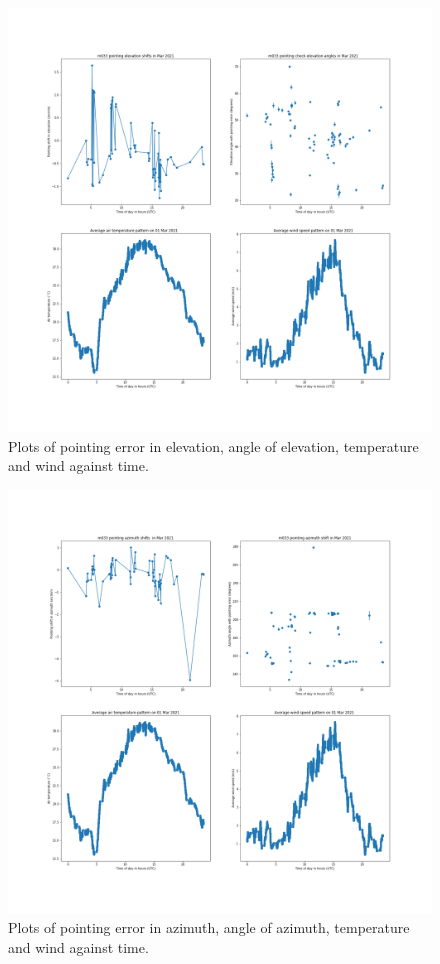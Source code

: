 \documentclass{article}
\begin{document}
\begin{figure}[H]
	\centering
	\includegraphics[scale=0.35]{m033_elev_Mar.png}
	
	\caption{Plots of pointing error in elevation, angle of elevation, temperature and wind against time.}
	\label{fig:m033ElevMar}
\end{figure}

\begin{figure}[H]
	\centering
	\includegraphics[scale=0.35]{m033_azim_Mar.png}
	
	\caption{Plots of pointing error in azimuth, angle of azimuth, temperature and wind against time.}
	\label{fig:m033AzimMar}
\end{figure}
\end{document}
